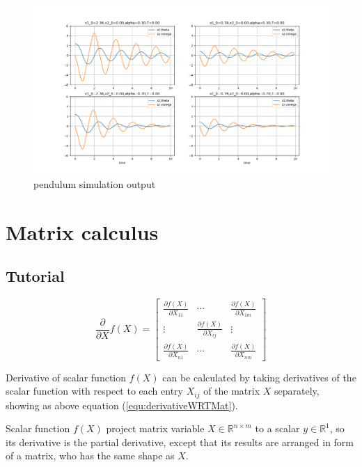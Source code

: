 \documentclass[titlepage]{article}
\begin{document}
\begin{figure}[htbp]
    \centering
    \includegraphics[width=\textwidth]{img/pendulum_sim.png}
    \caption{pendulum simulation output}
    \label{fig:pendulum_sim}
\end{figure}

\section{Matrix calculus}

\subsection{Tutorial}

\begin{equation}
    \frac{\partial}{\partial X}f(X) = 
    \begin{bmatrix}
        \frac{\partial f(X)}{\partial X_{11}} & \cdots & \frac{\partial f(X)}{\partial X_{1m}} \\
        \vdots & \frac{\partial f(X)}{\partial X_{ij}} & \vdots \\
        \frac{\partial f(X)}{\partial X_{n1}} & \cdots & \frac{\partial f(X)}{\partial X_{nm}}
    \end{bmatrix}
    \label{equ:derivativeWRTMat}
\end{equation}

Derivative of scalar function $f(X)$ can be calculated 
by taking derivatives of the scalar function with respect to 
each entry $X_{ij}$ of the matrix $X$ separately, showing 
as above equation (\ref{equ:derivativeWRTMat}). 

Scalar function $f(X)$ project matrix variable 
$X\in\mathbb{R}^{n\times m}$ to a scalar $y\in\mathbb{R}^{1}$,
so its derivative is the partial derivative, except that 
its results are arranged in form of a matrix, who has the same shape as $X$.
\end{document}
